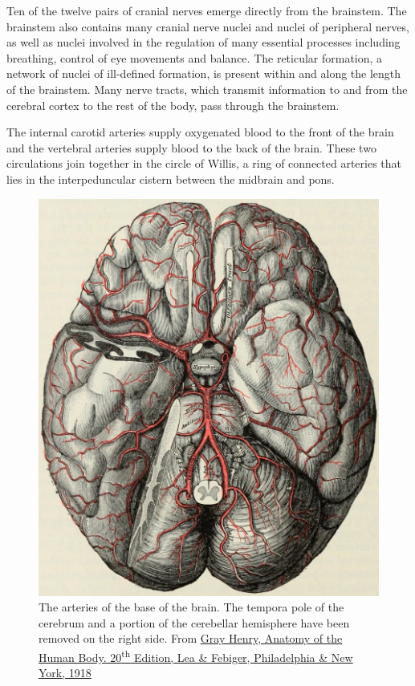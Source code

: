 Ten of the twelve pairs of cranial nerves emerge directly from the brainstem. The brainstem also contains many cranial nerve nuclei and nuclei of peripheral nerves, as well as nuclei involved in the regulation of many essential processes including breathing, control of eye movements and balance. The reticular formation, a network of nuclei of ill-defined formation, is present within and along the length of the brainstem. Many nerve tracts, which transmit information to and from the cerebral cortex to the rest of the body, pass through the brainstem.

The internal carotid arteries supply oxygenated blood to the front of the brain and the vertebral arteries supply blood to the back of the brain. These two circulations join together in the circle of Willis, a ring of connected arteries that lies in the interpeduncular cistern between the midbrain and pons.



\begin{figure}

{\centering \includegraphics[width=0.7\linewidth]{./figures/cns/GrayAnat1918p572} 

}

\caption{The arteries of the base of the brain. The tempora pole of the cerebrum and a portion of the cerebellar hemisphere have been removed on the right side. From \href{https://archive.org/details/anatomyofhumanbo1918gray/page/n6/mode/2up}{Gray Henry, Anatomy of the Human Body. 20\textsuperscript{th} Edition, Lea \& Febiger, Philadelphia \& New York, 1918}}\label{fig:bloodsupply}
\end{figure}

